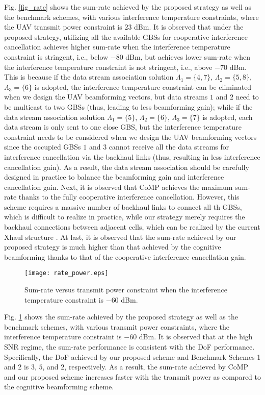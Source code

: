 \documentclass[onecolumn, draftclsnofoot, 12pt]{IEEEtran}
\begin{document}
Fig. \ref{fig_rate} shows the sum-rate achieved by the proposed strategy as well as the benchmark schemes, with various interference temperature constraints, where the UAV transmit power constraint is $23$ dBm. It is observed that under the proposed strategy, utilizing all the available GBSs for cooperative interference cancellation achieves higher sum-rate when the interference temperature constraint is stringent, i.e., below $-80$ dBm, but achieves lower sum-rate when the interference temperature constraint is not stringent, i.e., above $-70$ dBm. This is because if the data stream association solution $\Lambda_1=\{4,7\}$, $\Lambda_2=\{5,8\}$, $\Lambda_3=\{6\}$ is adopted, the interference temperature constraint can be eliminated when we design the UAV beamforming vectors, but data streams $1$ and $2$ need to be multicast to two GBSs (thus, leading to less beamforming gain); while if the data stream association solution $\Lambda_1=\{5\}$, $\Lambda_2=\{6\}$, $\Lambda_3=\{7\}$ is adopted, each data stream is only sent to one close GBS, but the interference temperature constraint needs to be considered when we design the UAV beamforming vectors since the occupied GBSs $1$ and $3$ cannot receive all the data streams for interference cancellation via the backhaul links (thus, resulting in less interference cancellation gain). As a result, the data stream association should be carefully designed in practice to balance the beamforming gain and interference cancellation gain. Next, it is observed that CoMP achieves the maximum sum-rate thanks to the fully cooperative interference cancellation. However, this scheme requires a massive number of backhaul links to connect all th GBSs, which is difficult to realize in practice, while our strategy merely requires the backhaul connections between adjacent cells, which can be realized by the current Xhaul structure \cite{Xhaul}. At last, it is observed that the sum-rate achieved by our proposed strategy is much higher than that achieved by the cognitive beamforming thanks to that of the cooperative interference cancellation gain.




\begin{figure}[t]
  \centering
  \texttt{[image: rate\_power.eps]}
  \caption{Sum-rate versus transmit power constraint when the interference temperature constraint is $-60$ dBm.}\label{fig_rate_power}
\end{figure}

Fig. \ref{fig_rate_power} shows the sum-rate achieved by the proposed strategy as well as the benchmark schemes, with various transmit power constraints, where the interference temperature constraint is $-60$ dBm. It is observed that at the high SNR regime, the sum-rate performance is consistent with the DoF performance. Specifically, the DoF achieved by our proposed scheme and Benchmark Schemes 1 and 2 is $3$, $5$, and $2$, respectively. As a result, the sum-rate achieved by CoMP and our proposed scheme increases faster with the transmit power as compared to the cognitive beamforming scheme.
\end{document}
